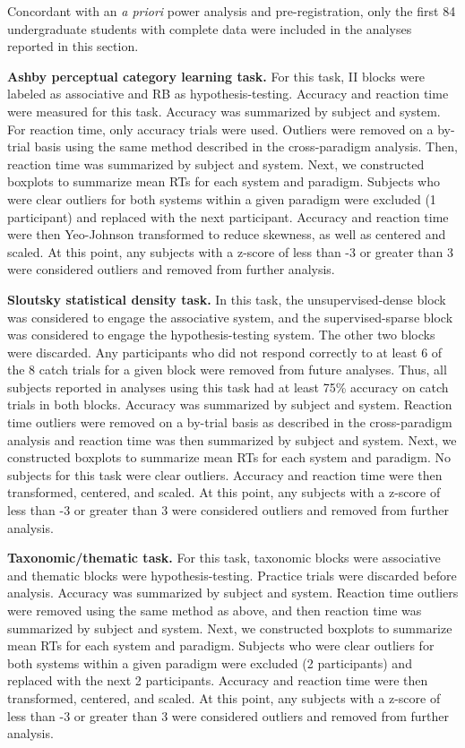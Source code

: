 \documentclass[../dissertation.tex]{subfiles}
\begin{document}
Concordant with an \textit{a priori} power analysis and pre-registration, only the first 84 undergraduate students with complete data were included in the analyses reported in this section.  \par
	\textbf{Ashby perceptual category learning task.} For this task, II blocks were labeled as associative and RB as hypothesis-testing. Accuracy and reaction time were measured for this task. Accuracy was summarized by subject and system. For reaction time, only accuracy trials were used. Outliers were removed on a by-trial basis using the same method described in the cross-paradigm analysis. Then, reaction time was summarized by subject and system. Next, we constructed boxplots to summarize mean RTs for each system and paradigm. Subjects who were clear outliers for both systems within a given paradigm were excluded (1 participant) and replaced with the next participant. Accuracy and reaction time were then Yeo-Johnson transformed to reduce skewness, as well as centered and scaled. At this point, any subjects with a z-score of less than -3 or greater than 3 were considered outliers and removed from further analysis. \par
	\textbf{Sloutsky statistical density task.} In this task, the unsupervised-dense block was considered to engage the associative system, and the supervised-sparse block was considered to engage the hypothesis-testing system. The other two blocks were discarded. Any participants who did not respond correctly to at least 6 of the 8 catch trials for a given block were removed from future analyses. Thus, all subjects reported in analyses using this task had at least 75\% accuracy on catch trials in both blocks. Accuracy was summarized by subject and system. Reaction time outliers were removed on a by-trial basis as described in the cross-paradigm analysis and reaction time was then summarized by subject and system. Next, we constructed boxplots to summarize mean RTs for each system and paradigm. No subjects for this task were clear outliers. Accuracy and reaction time were then transformed, centered, and scaled. At this point, any subjects with a z-score of less than -3 or greater than 3 were considered outliers and removed from further analysis. \par
	\textbf{Taxonomic/thematic task.} For this task, taxonomic blocks were associative and thematic blocks were hypothesis-testing. Practice trials were discarded before analysis. Accuracy was summarized by subject and system. Reaction time outliers were removed using the same method as above, and then reaction time was summarized by subject and system. Next, we constructed boxplots to summarize mean RTs for each system and paradigm. Subjects who were clear outliers for both systems within a given paradigm were excluded (2 participants) and replaced with the next  2 participants. Accuracy and reaction time were then transformed, centered, and scaled. At this point, any subjects with a z-score of less than -3 or greater than 3 were considered outliers and removed from further analysis. \par
\end{document}
